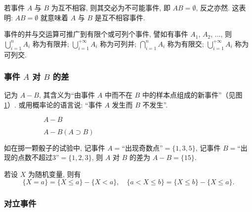 若事件 $A$ 与 $B$ 为互不相容,
则其交必为不可能事件,
即 $AB = \emptyset$,
反之亦然.
这表明:
$AB = \emptyset$ 就意味着 $A$ 与 $B$ 是互不相容事件.

事件的并与交运算可推广到有限个或可列个事件,
譬如有事件 $A_1$, $A_2$, $\dotsc$,
则 $\bigcup_{i=1}^n A_i$ 称为有限并;
$\bigcup_{i=1}^{+\infty} A_i$ 称为可列并;
$\bigcap_{i=1}^n A_i$ 称为有限交;
$\bigcup_{i=1}^{+\infty} A_i$ 称为可列交.

\subsubsection{事件 $A$ 对 $B$ 的差}

记为 $A-B$,
其含义为“由事件 $A$ 中而不在 $B$ 中的样本点组成的新事件”（见图 \ref{fig1.1.7}）.
或用概率论的语言说:
“事件 $A$ 发生而 $B$ 不发生”.

\begin{figure}[!ht]
  \centering
  \begin{subfigure}{0.4\linewidth}
    \centering
    \caption{$A-B$}
  \end{subfigure}
  \begin{subfigure}{0.4\linewidth}
    \centering
    \caption{$A-B(A \supset B)$}
  \end{subfigure}
  \caption{}\label{fig1.1.7}
\end{figure}

如在掷一颗骰子的试验中,
记事件 $A=$“出现奇数点”$=\{1,3,5\}$,
记事件 $B=$“出现的点数不超过3”$=\{1,2,3\}$,
则 $A$ 对 $B$ 的差为 $A-B=\{15\}$.

若设 $X$ 为随机变量,
则有
\[
  \{ X = a \}
  = \{ X \le a \} - \{ X < a \},
  \quad
  \{ a < X \le b \}
  = \{ X \le b \} - \{ X \le a \}.
\]

\subsubsection{对立事件}

